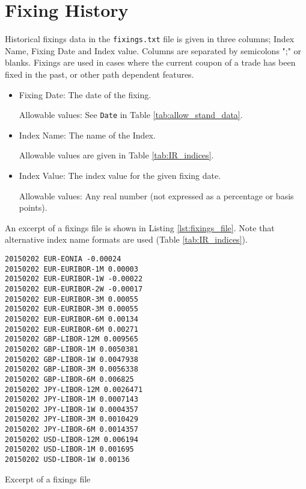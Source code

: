 \section{Fixing History}\label{sec:fixings}

Historical fixings data in the {\tt fixings.txt} file is given in
three columns;  Index Name,  Fixing Date and  Index value. Columns are
separated by semicolons ";" or blanks. Fixings are used in cases where
the current coupon of a trade has been fixed in the past, or other path dependent features.

\begin{itemize}

\item Fixing Date: The date of the fixing.  

Allowable values:  See \lstinline!Date! in Table \ref{tab:allow_stand_data}.

\item Index Name: The name of the Index. 

Allowable values are given  in Table \ref{tab:IR_indices}. %

\item Index Value: The index value for the given fixing
  date. 

Allowable values: Any real number (not expressed as a percentage or basis  points).
\end{itemize}

An excerpt of a fixings file is shown in Listing \ref{lst:fixings_file}. Note that alternative index name formats are used (Table \ref{tab:IR_indices}).

\begin{listing}[H]
\begin{verbatim}
20150202 EUR-EONIA -0.00024
20150202 EUR-EURIBOR-1M 0.00003
20150202 EUR-EURIBOR-1W -0.00022
20150202 EUR-EURIBOR-2W -0.00017
20150202 EUR-EURIBOR-3M 0.00055
20150202 EUR-EURIBOR-3M 0.00055
20150202 EUR-EURIBOR-6M 0.00134
20150202 EUR-EURIBOR-6M 0.00271
20150202 GBP-LIBOR-12M 0.009565
20150202 GBP-LIBOR-1M 0.0050381
20150202 GBP-LIBOR-1W 0.0047938
20150202 GBP-LIBOR-3M 0.0056338
20150202 GBP-LIBOR-6M 0.006825
20150202 JPY-LIBOR-12M 0.0026471
20150202 JPY-LIBOR-1M 0.0007143
20150202 JPY-LIBOR-1W 0.0004357
20150202 JPY-LIBOR-3M 0.0010429
20150202 JPY-LIBOR-6M 0.0014357
20150202 USD-LIBOR-12M 0.006194
20150202 USD-LIBOR-1M 0.001695
20150202 USD-LIBOR-1W 0.00136
\end{verbatim}
\caption{Excerpt of a fixings file}
\label{lst:fixings_file}  
\end{listing}

